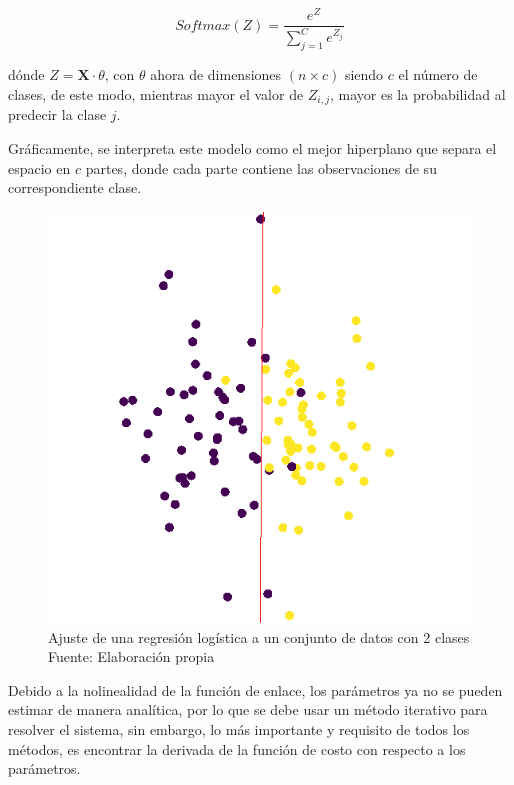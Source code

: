        \begin{equation}
            Softmax(Z) = \frac{e^{Z}}{\sum_{j=1}^{C} e^{Z_j}}
        \end{equation}
        
        \noindent dónde $Z = \mathbf{X}\cdot\theta$, con $\theta$ ahora de dimensiones $(n \times c)$ siendo $c$ el número de clases, de este modo, mientras mayor el valor de $Z_{i,j}$, mayor es la probabilidad al predecir la clase $j$. \citep{Goodfellow-et-al-2016}
        
        Gráficamente, se interpreta este modelo como el mejor hiperplano que separa el espacio en $c$ partes, donde cada parte contiene las observaciones de su correspondiente clase.
        
        \begin{figure}[H]
            \centering
            \includegraphics[scale=0.42]{imagenes/logistic_reg}
            \caption[Ajuste de regresión logística]{Ajuste de una regresión logística a un conjunto de datos con 2 clases\\ Fuente: Elaboración propia}
        \end{figure}
        Debido a la nolinealidad de la función de enlace, los parámetros ya no se pueden estimar de manera analítica, por lo que se debe usar un método iterativo para resolver el sistema, sin embargo, lo más importante y requisito de todos los métodos, es encontrar la derivada de la función de costo con respecto a los parámetros.
        
